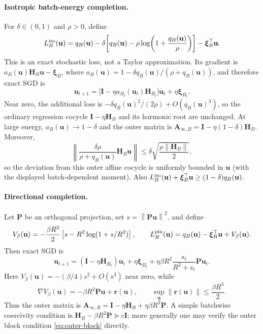 \documentclass[10pt]{article}
\theoremstyle{definition}
\theoremstyle{remark}
\newcommand{\norm}[1]{\left\lVert#1\right\rVert}
\newcommand{\Id}{\mathbf I}
\newcommand{\uvec}{\mathbf u}
\newcommand{\Hvec}{\mathbf H}
\newcommand{\Avec}{\mathbf A}
\newcommand{\xivec}{\boldsymbol\xi}
\begin{document}
\paragraph{Isotropic batch-energy completion.}
For $\delta\in(0,1)$ and $\rho>0$, define
\begin{equation}
 L_B^{\rm iso}(\uvec)
 =q_B(\uvec)-\delta\!\left[q_B(\uvec)
 -\rho\log\!\left(1+\frac{q_B(\uvec)}{\rho}\right)\right]
 -\xivec_B^\top\uvec .
 \label{eq:isotropic-regression-loss}
\end{equation}
This is an exact stochastic loss, not a Taylor approximation.  Its gradient is
$a_B(\uvec)\Hvec_B\uvec-\xivec_B$, where
$a_B(\uvec)=1-\delta q_B(\uvec)/(\rho+q_B(\uvec))$, and therefore exact SGD is
\begin{equation}
 \uvec_{t+1}
 =\bigl[\Id-\eta a_{B_t}(\uvec_t)\Hvec_{B_t}\bigr]\uvec_t
 +\eta\xivec_{B_t}.
 \label{eq:isotropic-regression-update}
\end{equation}
Near zero, the additional loss is
$-\delta q_B(\uvec)^2/(2\rho)+O(q_B(\uvec)^3)$, so the ordinary regression
cocycle $\Id-\eta\Hvec_B$ and its harmonic root are unchanged.  At large
energy, $a_B(\uvec)\to1-\delta$ and the outer matrix is
$\Avec_{\infty,B}=\Id-\eta(1-\delta)\Hvec_B$.  Moreover,
\[
 \left\|\frac{\delta\rho}{\rho+q_B(\uvec)}\Hvec_B\uvec\right\|
 \le \delta\sqrt{\frac{\rho\norm{\Hvec_B}}{2}},
\]
so the deviation from this outer affine cocycle is uniformly bounded in
$\uvec$ (with the displayed batch-dependent moment).  Also
$L_B^{\rm iso}(\uvec)+\xivec_B^\top\uvec\ge(1-\delta)q_B(\uvec)$.

\paragraph{Directional completion.}
Let $\mathbf P$ be an orthogonal projection, set
$s=\norm{\mathbf P\uvec}^2$, and define
\begin{equation}
 V_\beta(\uvec)=-\frac{\beta R^2}{2}
 \left[s-R^2\log(1+s/R^2)\right],\qquad
 L_B^{\rm pin}(\uvec)=q_B(\uvec)-\xivec_B^\top\uvec+V_\beta(\uvec).
 \label{eq:regression-loss}
\end{equation}
Then exact SGD is
\begin{equation}
 \uvec_{t+1}=(\Id-\eta\Hvec_{B_t})\uvec_t+\eta\xivec_{B_t}
 +\eta\beta R^2\frac{s_t}{R^2+s_t}\mathbf P\uvec_t .
 \label{eq:regression-update}
\end{equation}
Here $V_\beta(\uvec)=-(\beta/4)s^2+O(s^3)$ near zero, while
\[
 \nabla V_\beta(\uvec)=-\beta R^2\mathbf P\uvec+\mathbf r(\uvec),
 \qquad \sup_{\uvec}\norm{\mathbf r(\uvec)}\le\frac{\beta R^3}{2}.
\]
Thus the outer matrix is
$\Avec_{\infty,B}=\Id-\eta\Hvec_B+\eta\beta R^2\mathbf P$.  A simple
batchwise coercivity condition is
$\Hvec_B-\beta R^2\mathbf P\succeq c\Id$; more generally one may verify the
outer block condition \eqref{eq:outer-block} directly.
\end{document}

